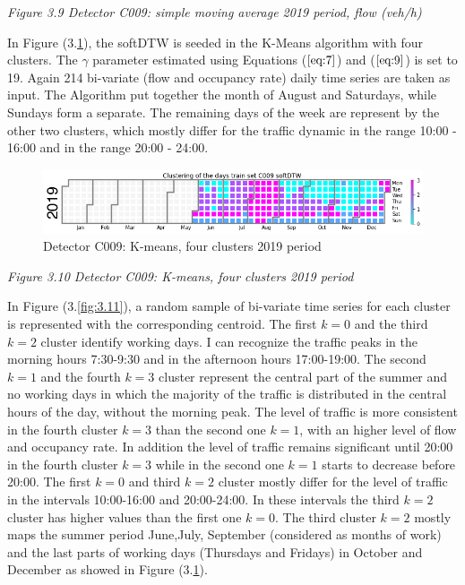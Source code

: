 \documentclass[11pt]{article}
\begin{document}
\emph{\small Figure 3.9 Detector C009: simple moving average 2019 period, flow (veh/h)}

    In Figure (3.\ref{fig:3.10}), the softDTW is seeded in the K-Means
algorithm with four clusters. The \(\gamma\) parameter estimated using
Equations (\(\ref{eq:7}\)) and (\(\ref{eq:9}\)) is set to 19. Again 214
bi-variate (flow and occupancy rate) daily time series are taken as
input. The Algorithm put together the month of August and Saturdays,
while Sundays form a separate. The remaining days of the week are
represent by the other two clusters, which mostly differ for the traffic
dynamic in the range 10:00 - 16:00 and in the range 20:00 - 24:00.

    \begin{figure}
    \centering
    \includegraphics{softDTW C009 K=4 2019.png}
    \caption{Detector C009: K-means, four clusters 2019 period}
    \label{fig:3.10}
\end{figure}

\emph{\small Figure 3.10 Detector C009: K-means, four clusters 2019 period}

    In Figure (3.\ref{fig:3.11}), a random sample of bi-variate time series
for each cluster is represented with the corresponding centroid. The
first \(k=0\) and the third \(k=2\) cluster identify working days. I can
recognize the traffic peaks in the morning hours 7:30-9:30 and in the
afternoon hours 17:00-19:00. The second \(k=1\) and the fourth \(k=3\)
cluster represent the central part of the summer and no working days in
which the majority of the traffic is distributed in the central hours of
the day, without the morning peak. The level of traffic is more
consistent in the fourth cluster \(k=3\) than the second one \(k=1\),
with an higher level of flow and occupancy rate. In addition the level
of traffic remains significant until 20:00 in the fourth cluster \(k=3\)
while in the second one \(k=1\) starts to decrease before 20:00. The
first \(k=0\) and third \(k=2\) cluster mostly differ for the level of
traffic in the intervals 10:00-16:00 and 20:00-24:00. In these intervals
the third \(k=2\) cluster has higher values than the first one \(k=0\).
The third cluster \(k=2\) mostly maps the summer period June,July,
September (considered as months of work) and the last parts of working
days (Thursdays and Fridays) in October and December as showed in Figure
(3.\ref{fig:3.10}).
\end{document}
